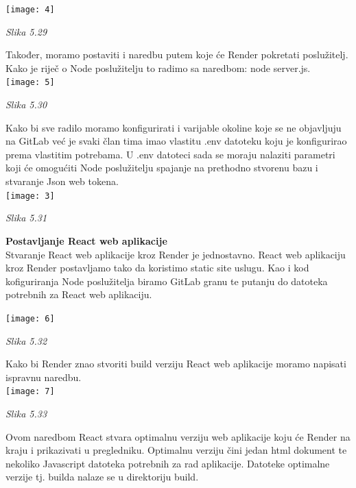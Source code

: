 \documentclass{article}
\begin{document}
	\texttt{[image: 4]}
	\begin{center}
		\textit{Slika 5.29}
	\end{center}

	
	Također, moramo postaviti i naredbu putem koje će Render pokretati poslužitelj. Kako je riječ o Node poslužitelju to radimo sa naredbom: node server.js. \\
	
	\texttt{[image: 5]}
	\begin{center}
		\textit{Slika 5.30}
	\end{center}

	Kako bi sve radilo moramo konfigurirati i varijable okoline koje se ne objavljuju na GitLab već je svaki član tima imao vlastitu .env datoteku koju je konfigurirao prema vlastitim potrebama. U .env datoteci sada se moraju nalaziti parametri koji će omogućiti Node poslužitelju spajanje na prethodno stvorenu bazu i stvaranje Json web tokena.\\
	
	 \texttt{[image: 3]}
	 \begin{center}
	 	\textit{Slika 5.31}
	 \end{center}
 
 	\textbf{Postavljanje React web aplikacije}\\
 	Stvaranje React web aplikacije kroz Render je jednostavno. React web aplikaciju kroz Render postavljamo tako da koristimo static site uslugu. Kao i kod kofiguriranja Node poslužitelja biramo GitLab granu te putanju do datoteka potrebnih za React web aplikaciju.
 	
 	\texttt{[image: 6]}
 	\begin{center}
 		\textit{Slika 5.32}
 	\end{center}
 	
 	Kako bi Render znao stvoriti build verziju React web aplikacije moramo napisati ispravnu naredbu. \\
 	
 	 	\texttt{[image: 7]}
 	\begin{center}
 		\textit{Slika 5.33}
 	\end{center}
 	
 	
	Ovom naredbom React stvara optimalnu verziju web aplikacije koju će Render na kraju i prikazivati u pregledniku. Optimalnu verziju čini jedan html dokument te nekoliko Javascript datoteka potrebnih za rad aplikacije. Datoteke optimalne verzije tj. builda nalaze se u direktoriju build. \\
	
\end{document}
